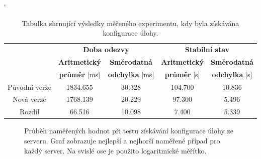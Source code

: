             \begin{table}[ht]
             \catcode`
             \begin{adjustwidth}{-0.5cm}{}
             \begin{center}
              \begin{tabular}{| c || c | c || c | c |} \hline
                \multirow{3}{*}{}  &   \multicolumn{2}{c||}{\textbf{Doba odezvy}}  &  \multicolumn{2}{c|}{\textbf{Stabilní stav}}\\ \cline{2-5}
                 & \textbf{Aritmetický}  &  \textbf{Směrodatná}  &  \textbf{Aritmetický} &  \textbf{Směrodatná}\\ 
                 & \textbf{průměr} [ms]  &  \textbf{odchylka} [ms]  &  \textbf{průměr} [s]  &  \textbf{odchylka} [s]\\ \hline
                Původní verze &  1834.655 &  30.328 &  104.700 & 10.836 \\\hline
                Nová verze &  1768.139 &  20.229 &  97.300 &  5.496\\\hline
                Rozdíl &  66.516 &  10.098 &  7.400 &  5.339\\\hline  
              \end{tabular}
              \caption{Tabulka shrnující výsledky měřeného experimentu, kdy byla získávána konfigurace úlohy.}
              \label{tabGetFreestyleFinal}
             \end{center}
             \end{adjustwidth}
            \end{table}

            \begin{figure}[h!t]
             \begin{adjustwidth}{-0.5cm}{}
                \begin{center}
                    \caption{Průběh naměřených hodnot při testu získávání konfigurace úlohy ze serveru.
                        Graf zobrazuje nejlepší a nejhorší naměřené případ pro každý server.  
                        Na svislé ose je použito logaritmické měřítko.}
                    \label{imgGetFreestyleCely}
                \end{center}
             \end{adjustwidth}
            \end{figure}

